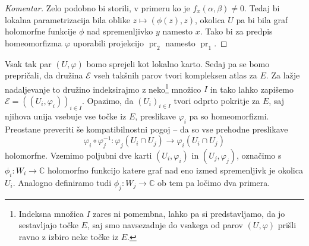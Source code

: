 \documentclass[mat1]{fmfdelo}
\numberwithin{equation}{section}
\newcommand{\C}{\mathbb C}
\newcommand{\inv}{^{-1}}
\DeclareMathOperator{\pr}{pr}
\theoremstyle{definition}
\newenvironment{komentar}[1][Komentar]{\begin{proof}[#1]\let\qed\relax}{\end{proof}}
\begin{document}


\begin{komentar}
    Zelo podobno bi storili, v primeru ko je $f_x(\alpha, \beta) \neq 0$. Tedaj bi lokalna parametrizacija bila oblike $z \mapsto (\phi(z), z)$, okolica $U$ pa bi bila graf holomorfne funkcije $\phi$ nad spremenljivko $y$ namesto $x$. Tako bi za predpis homeomorfizma $\varphi$ uporabili projekcijo $\pr_2$ namesto $\pr_1$.
\end{komentar}

Vsak tak par $(U, \varphi)$ bomo sprejeli kot lokalno karto. 
Sedaj pa se bomo prepričali, da družina $\mathcal{E}$ vseh takšnih parov tvori kompleksen atlas za $E$. Za lažje nadaljevanje to družino indeksirajmo z neko\footnote{Indeksna množica $I$ zares ni pomembna, lahko pa si predstavljamo, da jo sestavljajo točke $E$, saj smo navsezadnje do vsakega od parov $(U, \varphi)$ prišli ravno z izbiro neke točke iz $E$. } množico $I$ in tako lahko zapišemo $\mathcal{E} = ((U_i, \varphi_i))_{i \in I}$. 
Opazimo, da  
$(U_i)_{i \in I}$ tvori odprto pokritje za $E$, saj njihova unija vsebuje vse točke iz $E$, preslikave $\varphi_i$ pa so homeomorfizmi. Preostane preveriti še kompatibilnostni pogoj -- da so vse prehodne preslikave
\[
    \varphi_i \circ \varphi_j\inv : \varphi_j(U_i \cap U_j) \to \varphi_i(U_i \cap U_j)  
\]
holomorfne. Vzemimo poljubni dve karti $(U_i, \varphi_i)$ in $(U_j, \varphi_j)$, označimo s $\phi_i : W_i \to \C$ holomorfno funkcijo katere graf nad eno izmed spremenljivk je okolica $U_i$. Analogno definiramo tudi $\phi_j : W_j \to \C$ ob tem pa ločimo dva primera. 
\end{document}
